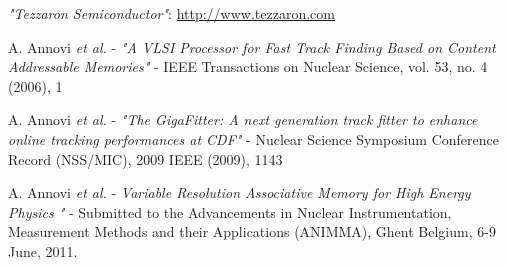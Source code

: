 \documentclass{cmspaper}
\begin{document}
\begin{thebibliography}{99}

 {\it "Tezzaron Semiconductor"}:
\url{http://www.tezzaron.com}







 A. Annovi {\it et al.} - {\it "A VLSI Processor for Fast Track Finding Based on Content Addressable Memories"} - IEEE Transactions on Nuclear Science, vol. 53, no. 4 (2006), 1

 A. Annovi {\it et al.} - {\it "The GigaFitter: A next generation track fitter to enhance online tracking performances at CDF"} - Nuclear Science Symposium Conference Record (NSS/MIC), 2009 IEEE (2009), 1143


 A. Annovi {\it et al.}  - {\it Variable Resolution Associative Memory for High Energy Physics
"} - Submitted to the Advancements in Nuclear Instrumentation, Measurement Methods and their Applications (ANIMMA), Ghent Belgium, 6-9 June, 2011.



\end{thebibliography}
\newpage
\appendix
%
%
%
%
\end{document}

